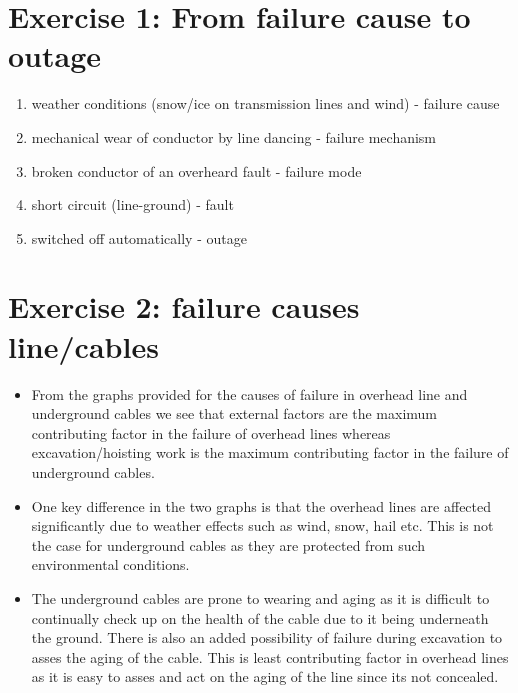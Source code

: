 \justifying

\section*{\textbf{Exercise 1: From failure cause to outage}}
\begin{enumerate}
    \item weather conditions (snow/ice on transmission lines and wind) - failure cause
    \item mechanical wear of conductor by line dancing - failure mechanism
    \item broken conductor of an overheard fault - failure mode 
    \item short circuit (line-ground) - fault
    \item switched off automatically - outage
\end{enumerate}

\section*{\textbf{Exercise 2: failure causes line/cables}}
\begin{itemize}
    \item From the graphs provided for the causes of failure in overhead line and underground cables we see that external factors are the maximum contributing factor in the failure of overhead lines whereas excavation/hoisting work is the maximum contributing factor in the failure of underground cables. 
    \item One key difference in the two graphs is that the overhead lines are affected significantly due to weather effects such as wind, snow, hail etc. This is not the case for underground cables as they are protected from such environmental conditions.
    \item The underground cables are prone to wearing and aging as it is difficult to continually check up on the health of the cable due to it being underneath the ground. There is also an added possibility of failure during excavation to asses the aging of the cable. This is least contributing factor in overhead lines as it is easy to asses and act on the aging of the line since its not concealed.
\end{itemize}


